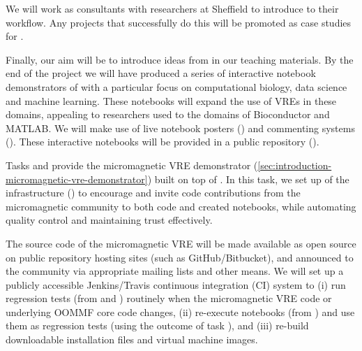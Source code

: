 \begin{workpackage}
\begin{tasklist}
\begin{task}[title=Introduce \TheProject to Researchers and Teachers, id=project-intro,lead=USH,PM=20,partners={USO}]
  We will work as consultants with researchers at Sheffield to
  introduce \TheProject to their workflow. Any projects that
  successfully do this will be promoted as case studies for
  \TheProject.

  Finally, our aim will be to introduce ideas from
   in our teaching materials. By the end of the
  project we will have produced a series of interactive notebook
  demonstrators  of \TheProject with a
  particular focus on computational biology, data science and machine
  learning. These notebooks will expand the use of VREs in these
  domains, appealing to researchers used to the domains of
  Bioconductor and MATLAB. We will make use of live notebook posters
  () and commenting systems
  (). These interactive notebooks
  will be provided in a public repository
  ().
\end{task}

\begin{task}[id=dissemination-of-oommf-nb-virtual-environment,
  title=Open source dissemination of micromagnetic VRE,
  lead=USO,PM=4,partners={SR,USH,PS},wphases=24-28]
  Tasks  and
   provide the
  micromagnetic VRE demonstrator
  (\ref{sec:introduction-micromagnetic-vre-demonstrator}) built on top
  of \TheProject.  In this task, we set up of the infrastructure
  () to encourage
  and invite code contributions from the micromagnetic community to
  both code and created notebooks, while automating quality control
  and maintaining trust effectively.

  The source code of the micromagnetic VRE will be made available as
  open source on public repository hosting sites (such as
  GitHub/Bitbucket), and announced to the community via appropriate
  mailing lists and other means. We will set up a publicly accessible
  Jenkins/Travis continuous integration (CI) system to (i) run
  regression tests (from
   and
  ) routinely when the
  micromagnetic VRE code or underlying OOMMF core code changes, (ii)
  re-execute notebooks (from
  ) and use them as
  regression tests (using the outcome of task
  ), and (iii) re-build
  downloadable installation files and virtual machine images.


\end{task}
\end{tasklist}
\end{workpackage}
